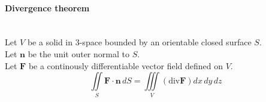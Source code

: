 \documentclass[10pt]{article}
\newcommand{\bs}[1]{\pmb{#1}}
\begin{document}
\paragraph{Divergence theorem}\ \\
Let $V$ be a solid in 3-space bounded by an orientable closed surface $S$.\\
Let $\bs{n}$ be the unit outer normal to $S$.\\
Let $\bs{F}$ be a continously differentiable vector field defined on $V$.
\begin{equation*}
\iint\limits_S \bs{F} \cdot \bs{n}\, dS
= \iiint\limits_V (\text{div} \bs{F}) dx\, dy\, dz
\end{equation*}
\end{document}
